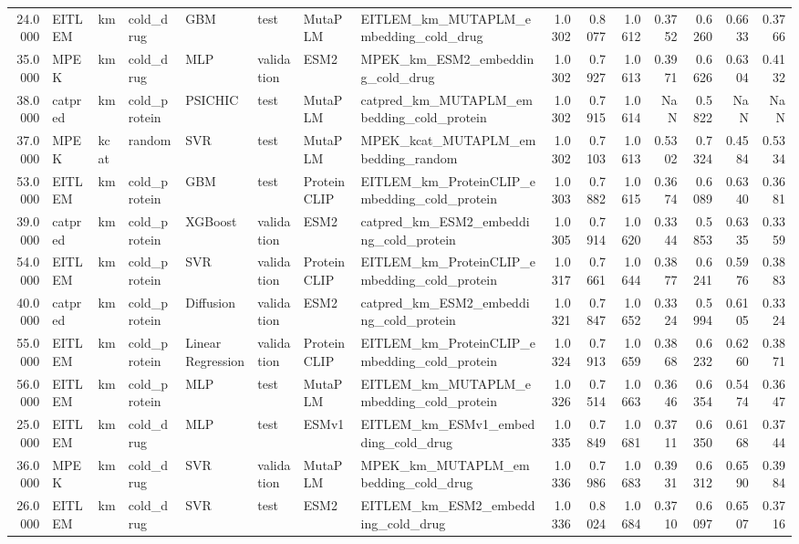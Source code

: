 \begin{tabular}{rlllllllrrrrrrr}
24.0000 & EITLEM & km & cold_drug & GBM & test & MutaPLM & EITLEM_km_MUTAPLM_embedding_cold_drug & 1.0302 & 0.8077 & 1.0612 & 0.3752 & 0.6260 & 0.6633 & 0.3766 \\
35.0000 & MPEK & km & cold_drug & MLP & validation & ESM2 & MPEK_km_ESM2_embedding_cold_drug & 1.0302 & 0.7927 & 1.0613 & 0.3971 & 0.6626 & 0.6304 & 0.4132 \\
38.0000 & catpred & km & cold_protein & PSICHIC & test & MutaPLM & catpred_km_MUTAPLM_embedding_cold_protein & 1.0302 & 0.7915 & 1.0614 & NaN & 0.5822 & NaN & NaN \\
37.0000 & MPEK & kcat & random & SVR & test & MutaPLM & MPEK_kcat_MUTAPLM_embedding_random & 1.0302 & 0.7103 & 1.0613 & 0.5302 & 0.7324 & 0.4584 & 0.5334 \\
53.0000 & EITLEM & km & cold_protein & GBM & test & ProteinCLIP & EITLEM_km_ProteinCLIP_embedding_cold_protein & 1.0303 & 0.7882 & 1.0615 & 0.3674 & 0.6089 & 0.6340 & 0.3681 \\
39.0000 & catpred & km & cold_protein & XGBoost & validation & ESM2 & catpred_km_ESM2_embedding_cold_protein & 1.0305 & 0.7914 & 1.0620 & 0.3344 & 0.5853 & 0.6335 & 0.3359 \\
54.0000 & EITLEM & km & cold_protein & SVR & validation & ProteinCLIP & EITLEM_km_ProteinCLIP_embedding_cold_protein & 1.0317 & 0.7661 & 1.0644 & 0.3877 & 0.6241 & 0.5976 & 0.3883 \\
40.0000 & catpred & km & cold_protein & Diffusion & validation & ESM2 & catpred_km_ESM2_embedding_cold_protein & 1.0321 & 0.7847 & 1.0652 & 0.3324 & 0.5994 & 0.6105 & 0.3324 \\
55.0000 & EITLEM & km & cold_protein & Linear Regression & validation & ProteinCLIP & EITLEM_km_ProteinCLIP_embedding_cold_protein & 1.0324 & 0.7913 & 1.0659 & 0.3868 & 0.6232 & 0.6260 & 0.3871 \\
56.0000 & EITLEM & km & cold_protein & MLP & test & MutaPLM & EITLEM_km_MUTAPLM_embedding_cold_protein & 1.0326 & 0.7514 & 1.0663 & 0.3646 & 0.6354 & 0.5474 & 0.3647 \\
25.0000 & EITLEM & km & cold_drug & MLP & test & ESMv1 & EITLEM_km_ESMv1_embedding_cold_drug & 1.0335 & 0.7849 & 1.0681 & 0.3711 & 0.6350 & 0.6168 & 0.3744 \\
36.0000 & MPEK & km & cold_drug & SVR & validation & MutaPLM & MPEK_km_MUTAPLM_embedding_cold_drug & 1.0336 & 0.7986 & 1.0683 & 0.3931 & 0.6312 & 0.6590 & 0.3984 \\
26.0000 & EITLEM & km & cold_drug & SVR & test & ESM2 & EITLEM_km_ESM2_embedding_cold_drug & 1.0336 & 0.8024 & 1.0684 & 0.3710 & 0.6097 & 0.6507 & 0.3716 \\

\end{tabular}
